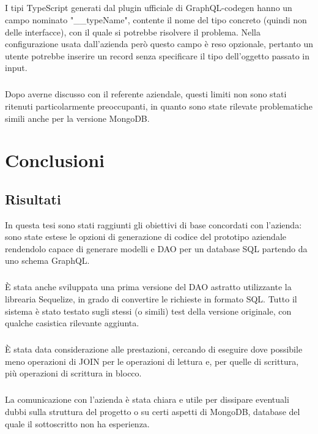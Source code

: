 \documentclass[a4paper, 12pt]{report}
\begin{document}
        \paragraph*{}
        I tipi TypeScript generati dal plugin ufficiale di GraphQL-codegen hanno un campo nominato "__typeName", contente il nome del tipo concreto (quindi non delle interfacce), con il quale si potrebbe risolvere il problema.
        Nella configurazione usata dall'azienda però questo campo è reso opzionale, pertanto un utente potrebbe inserire un record senza specificare il tipo dell'oggetto passato in input.
        \paragraph*{}
        Dopo averne discusso con il referente aziendale, questi limiti non sono stati ritenuti particolarmente preoccupanti, in quanto sono state rilevate problematiche simili anche per la versione MongoDB.
    \newpage
    \chapter{Conclusioni}
      \section*{Risultati}
      In questa tesi sono stati raggiunti gli obiettivi di base concordati con l'azienda: sono state estese le opzioni di generazione di codice del prototipo aziendale rendendolo capace di generare modelli e DAO per un database SQL partendo da uno schema GraphQL.
      \paragraph*{}
      È stata anche sviluppata una prima versione del DAO astratto utilizzante la librearia Sequelize, in grado di convertire le richieste in formato SQL.
      Tutto il sistema è stato testato sugli stessi (o simili) test della versione originale, con qualche casistica rilevante aggiunta.
      \paragraph*{}
        È stata data considerazione alle prestazioni, cercando di eseguire dove possibile meno operazioni di JOIN per le operazioni di lettura e, per quelle di scrittura, più operazioni di scrittura in blocco.
      \paragraph*{}
        La comunicazione con l'azienda è stata chiara e utile per dissipare eventuali dubbi sulla struttura del progetto o su certi aspetti di MongoDB, database del quale il sottoscritto non ha esperienza.
\end{document}
